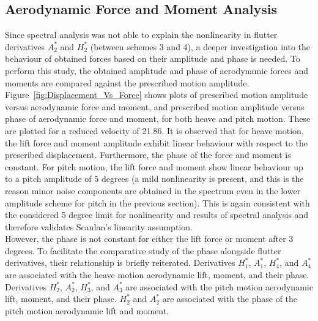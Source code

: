 \documentclass[../main]{subfiles}
\begin{document}
\subsection{Aerodynamic Force and Moment Analysis}

Since spectral analysis was not able to explain the nonlinearity in flutter derivatives $A_2^*$ and $H_2^*$ (between schemes 3 and 4), 
a deeper investigation into the behaviour of obtained forces based on their amplitude and phase is needed.
To perform this study, the obtained amplitude and phase of aerodynamic forces and moments are compared against the prescribed motion 
amplitude. \\

Figure~\ref{fig:Displacement_Vs_Force} shows plots of prescribed motion amplitude versus aerodynamic force and moment, and 
prescribed motion amplitude versus phase of aerodynamic force and moment, for both heave and pitch motion. These are plotted for 
a reduced velocity of 21.86. It is observed that for heave motion, the lift force and moment amplitude 
exhibit linear behaviour with respect to the prescribed displacement. Furthermore, the phase of the force and 
moment is constant. For pitch motion, the lift force and moment show linear behaviour up to a pitch amplitude of 5 degrees 
(a mild nonlinearity is present, and this is the reason minor noise components are obtained in the spectrum even in the lower 
amplitude scheme for pitch in the previous section). This is again consistent with the considered 5 degree limit for nonlinearity and 
results of spectral analysis and therefore validates Scanlan's linearity assumption. \\

However, the phase is not constant for either the lift force or moment after 3 degrees. To facilitate the comparative 
study of the phase alongside flutter derivatives, their relationship is briefly reiterated. Derivatives $H_1^*$, $A_1^*$, $H_4^*$, and $A_4^*$ are associated with the heave motion aerodynamic 
lift, moment, and their phase. Derivatives $H_2^*$, $A_2^*$, $H_3^*$, and $A_3^*$ are associated with the pitch motion aerodynamic 
lift, moment, and their phase. $H_2^*$ and $A_2^*$ are associated with the phase of the pitch motion aerodynamic 
lift and moment. \\
\end{document}
